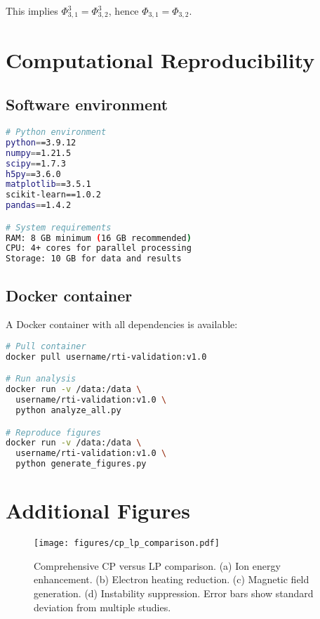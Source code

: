 \documentclass[aps,pre,twocolumn,superscriptaddress]{revtex4-2}
\begin{document}
This implies $\Phi_{3,1}^3 = \Phi_{3,2}^3$, hence $\Phi_{3,1} = \Phi_{3,2}$.

\section{Computational Reproducibility}

\subsection{Software environment}

\begin{lstlisting}[language=bash, caption=Required packages]
# Python environment
python==3.9.12
numpy==1.21.5
scipy==1.7.3
h5py==3.6.0
matplotlib==3.5.1
scikit-learn==1.0.2
pandas==1.4.2

# System requirements
RAM: 8 GB minimum (16 GB recommended)
CPU: 4+ cores for parallel processing
Storage: 10 GB for data and results
\end{lstlisting}

\subsection{Docker container}

A Docker container with all dependencies is available:

\begin{lstlisting}[language=bash, caption=Docker setup]
# Pull container
docker pull username/rti-validation:v1.0

# Run analysis
docker run -v /data:/data \
  username/rti-validation:v1.0 \
  python analyze_all.py

# Reproduce figures
docker run -v /data:/data \
  username/rti-validation:v1.0 \
  python generate_figures.py
\end{lstlisting}

\section{Additional Figures}

\begin{figure}[h]
\texttt{[image: figures/cp\_lp\_comparison.pdf]}
\caption{Comprehensive CP versus LP comparison. (a) Ion energy enhancement. (b) Electron heating reduction. (c) Magnetic field generation. (d) Instability suppression. Error bars show standard deviation from multiple studies.}
\label{fig:cp_lp_extended}
\end{figure}
\end{document}
